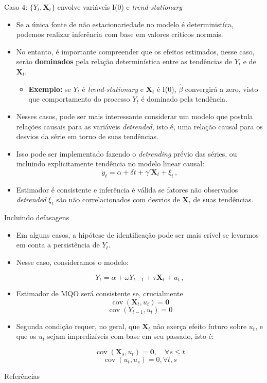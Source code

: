 \documentclass[11pt]{beamer}
\begin{document}
			\begin{frame}{Caso 4: $\{Y_t,\boldsymbol{X}_t\}$ envolve variáveis I(0) e \textit{trend-stationary}}
				\begin{itemize}
					\item Se a única fonte de não estacionariedade no modelo é deterministíca, podemos realizar inferência com base em valores críticos normais.
					\item No entanto, é importante compreender que os efeitos estimados, nesse caso, serão \textbf{dominados} pela relação determinística entre as tendências de $Y_t$ e de $\boldsymbol{X}_t$.
					\begin{itemize}
						\item \textbf{Exemplo:} se $Y_t$ é \textit{trend-stationary} e $\boldsymbol{X}_t$ é I(0), $\hat \beta$ convergirá a  zero, visto que comportamento do processo $Y_t$ é {\color{blue}dominado} pela tendência.
					\end{itemize}
					\item Nesses casos, pode ser mais interessante considerar um modelo que postula relações causais para as variáveis \textit{detrended}, isto é, uma relação causal para os desvios da série em torno de suas tendências.
					\item Isso pode ser implementado fazendo o \textit{detrending} prévio das séries, ou incluindo explicitamente tendência no modelo linear causal:
					\begin{equation*}
						y_t = \alpha + \delta t + \gamma'\boldsymbol{X}_t+\xi_t \, ,
					\end{equation*}
					\item Estimador é consistente e inferência é válida se fatores não observados \textit{detrended} $\xi_t$ são não correlacionados com desvios de $\boldsymbol{X}_t$ de suas tendências.  
				\end{itemize}
			\end{frame}
			
			\begin{frame}{Incluindo defasagens}
				\begin{itemize}
					\item Em alguns casos, a hipótese de identificação pode ser mais crível se levarmos em conta a persistência de $Y_t$.
					\item Nesse caso, consideramos o modelo:
					
					$$Y_t = \alpha + \omega Y_{t-1} + \tau \boldsymbol{X}_{t}+ u_t\, ,$$
					\item Estimador de MQO será consistente se, crucialmente
$$\operatorname{cov}(\boldsymbol{X}_t, u_t) = \boldsymbol{0}$$
$$\operatorname{cov}(Y_{t-1}, u_t)=0$$
\item Segunda condição requer, no geral, que $\boldsymbol{X}_t$ não exerça efeito futuro sobre $u_t$, e que os $u_t$ sejam impredizíveis com base em seu passado, isto é:

$$\operatorname{cov}(\boldsymbol{X}_s, u_t)= \boldsymbol{0}, \quad \forall s \leq t$$
$$\operatorname{cov}(u_t,u_s)=0, \forall t,s$$
				\end{itemize}
			\end{frame}
\appendix
\begin{frame}[allowframebreaks]{Referências}
	\printbibliography
\end{frame}
\end{document}
